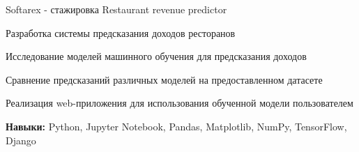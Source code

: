 \begin{cventries}
  \cventry
    {Softarex - стажировка} %
    {Restaurant revenue predictor} %
    {} %
    {} %
    {
      \begin{cvitems} %
        \item {Разработка системы предсказания доходов ресторанов}
        \item {Исследование моделей машинного обучения для предсказания доходов}
        \item {Сравнение предсказаний различных моделей на предоставленном датасете}
        \item {Реализация web-приложения для использования обученной модели пользователем}
        \item {\textbf{Навыки:} Python, Jupyter Notebook, Pandas, Matplotlib, NumPy, TensorFlow, Django}
      \end{cvitems}
    }
\end{cventries}
